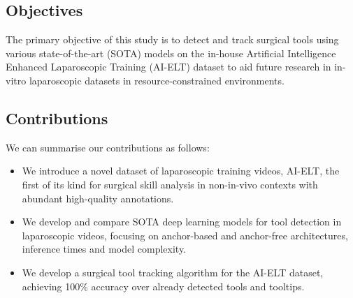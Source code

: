 \subsection{Objectives}

The primary objective of this study is to detect and track surgical tools using various state-of-the-art (SOTA) models on the in-house Artificial Intelligence Enhanced Laparoscopic Training (AI-ELT) dataset to aid future research in in-vitro laparoscopic datasets in resource-constrained environments.

\subsection{Contributions}

We can summarise our contributions as follows:

\begin{itemize}[noitemsep, left=0pt]
\item We introduce a novel dataset of laparoscopic training videos, AI-ELT, the first of its kind for surgical skill analysis in non-in-vivo contexts with abundant high-quality annotations.
\item We develop and compare SOTA deep learning models for tool detection in laparoscopic videos, focusing on anchor-based and anchor-free architectures, inference times and model complexity.
\item We develop a surgical tool tracking algorithm for the AI-ELT dataset, achieving 100\% accuracy over already detected tools and tooltips.
\end{itemize}

